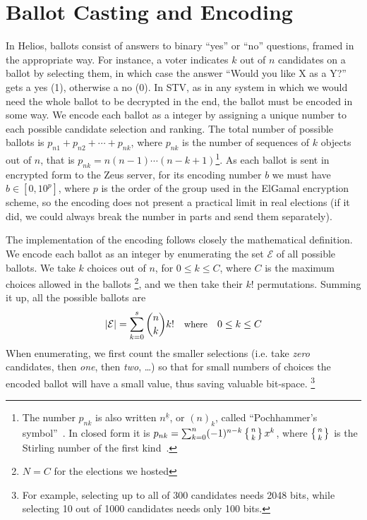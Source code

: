 \documentclass[letterpaper,twocolumn,10pt]{article}
\begin{document}
\section{Ballot Casting and Encoding}

In Helios, ballots consist of answers to binary ``yes'' or ``no''
questions, framed in the appropriate way. For instance, a voter
indicates $k$ out of $n$ candidates on a ballot by selecting them, in
which case the answer ``Would you like X as a Y?'' gets a yes (1),
otherwise a no (0). In STV, as in any system in which we would need
the whole ballot to be decrypted in the end, the ballot must be
encoded in some way. We encode each ballot as a integer by assigning a
unique number to each possible candidate selection and ranking. The
total number of possible ballots is $p _{n1} + p_{n2} + \cdots + p
_{nk}$, where $p_{nk}$ is the number of sequences of $k$ objects out
of $n$, that is $p_{nk} = n(n - 1)\cdots(n - k + 1)$\footnote{The
  number $p_{nk}$ is also written $n^{\underline{k}}$, or $(n)_k$,
  called ``Pochhammer's symbol''~\cite[p.\ 48]{graham:1994}. In closed
  form it is $p_{nk} = \sum_{k=0}^{n} (-1)^{n-k}\left\{n \atop
    k\right\}x^k$, where $\left\{n \atop k\right\}$ is the Stirling
  number of the first kind~\cite{weisstein:pochhammer}.}. As each
ballot is sent in encrypted form to the Zeus server, for its encoding
number $b$ we must have $b \in [0, 10^p]$, where $p$ is the order of
the group used in the ElGamal encryption scheme, so the encoding does
not present a practical limit in real elections (if it did, we could
always break the number in parts and send them separately).

The implementation of the encoding follows closely the mathematical
definition. We encode each ballot as an integer by enumerating the set
$\mathcal{E}$ of all possible ballots. We take $k$ choices out of $n$,
for $0\leq k \leq C$, where $C$ is the maximum choices allowed in the
ballots \footnote{$N=C$ for the elections we hosted}, and we then take
their $k!$ permutations. Summing it up, all the possible ballots are
\begin{equation}
\label{eq:max_encoded}
|\mathcal{E}| = \sum^{s}_{k=0}\binom{n}{k}k! \quad
\hbox{\small where} \quad 0\leq k \leq C
\end{equation}
When enumerating, we first count the smaller selections (i.e. take
\textit{zero} candidates, then \textit{one}, then \textit{two},
\ldots) so that for small numbers of choices the encoded ballot will
have a small value, thus saving valuable bit-space. \footnote{ For
  example, selecting up to all of 300 candidates needs 2048 bits,
  while selecting 10 out of 1000 candidates needs only 100 bits.}
\end{document}
